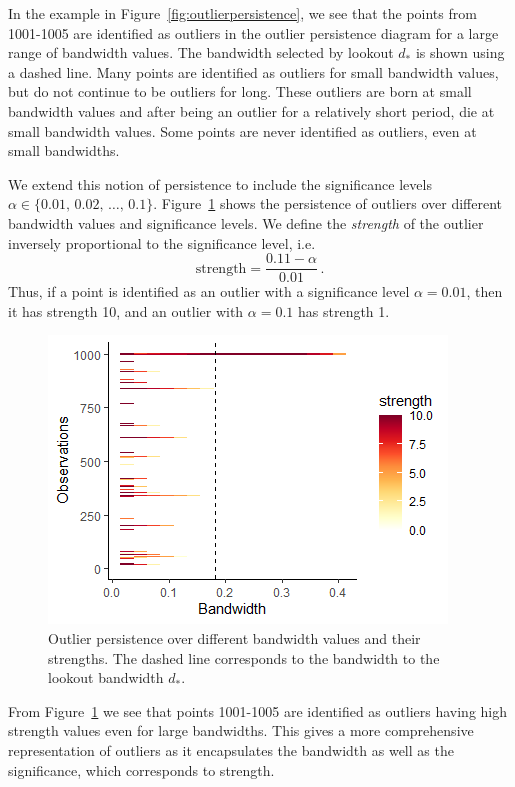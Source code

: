 \documentclass[letter,12pt]{article}
\begin{document}
In the example in Figure~\ref{fig:outlierpersistence}, we see that the points from 1001-1005  are identified as outliers in the outlier persistence diagram for a large range of bandwidth values. The bandwidth selected by lookout $d_*$ is shown using a dashed line.  %
Many points are identified as outliers for small bandwidth values, but do not continue to be outliers for long. These outliers are born at small bandwidth values and after being an outlier for a relatively short period, die at small bandwidth values. Some points are never identified as outliers, even at small bandwidths.  

We extend this notion of persistence to include the significance levels $\alpha \in \{0.01, \, 0.02, \, \ldots, \, 0.1 \}$. Figure~\ref{fig:outlierpersistence2} shows the persistence of outliers over different bandwidth values and significance levels. We define the \textit{strength} of the outlier inversely proportional to the significance level, i.e. 
\begin{equation}
    \text{strength} = \frac{0.11 - \alpha}{0.01}  \, .
\end{equation}
Thus, if a point is identified as an outlier with a significance level  $ \alpha = 0.01$, then it has  strength  10, and  an outlier with $\alpha = 0.1$ has strength 1. 
\begin{figure}[!ht]
    \centering
    \includegraphics[scale=0.8]{Graphics/persistence_alpha.png}
    \caption{Outlier persistence over different bandwidth values and their strengths. The dashed line corresponds to the bandwidth to the lookout bandwidth $d_*$.}
    \label{fig:outlierpersistence2}
\end{figure}

From Figure~\ref{fig:outlierpersistence2} we see that points 1001-1005 are identified as outliers having high strength values even for large bandwidths. This gives a more comprehensive representation of outliers as it encapsulates the bandwidth as well as the significance, which corresponds to strength.
\end{document}
